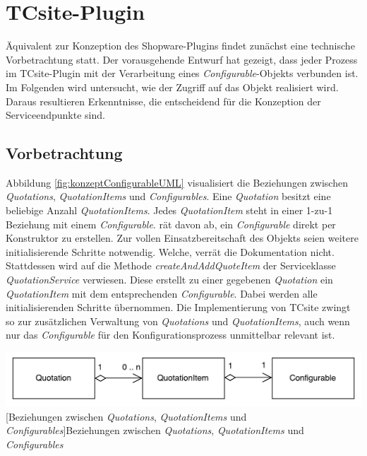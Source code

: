 \documentclass[11pt, a4paper, titlepage, listof=totoc, bibliography=totoc, index=totoc, twoside, openright, headings=normal]{scrreprt}
\begin{document}
\section{TCsite-Plugin}
\label{TCsite-Plugin}
Äquivalent zur Konzeption des Shopware-Plugins findet zunächst eine technische Vorbetrachtung statt. Der vorausgehende Entwurf hat gezeigt, dass jeder Prozess im TCsite-Plugin mit der Verarbeitung eines \emph{Configurable}-Objekts verbunden ist. Im Folgenden wird untersucht, wie der Zugriff auf das Objekt realisiert wird. Daraus resultieren Erkenntnisse, die entscheidend für die Konzeption der Serviceendpunkte sind.

\subsection{Vorbetrachtung}
Abbildung \ref{fig:konzeptConfigurableUML} visualisiert die Beziehungen zwischen \emph{Quotations}, \emph{QuotationItems} und \emph{Configurables}. Eine \emph{Quotation} besitzt eine beliebige Anzahl \emph{QuotationItems}. Jedes \emph{QuotationItem} steht in einer 1-zu-1 Beziehung mit einem \emph{Configurable}. \citet{tactonTCsiteDevelopmentManual} rät davon ab, ein \emph{Configurable} direkt per Konstruktor zu erstellen. Zur vollen Einsatzbereitschaft des Objekts seien weitere initialisierende Schritte notwendig. Welche, verrät die Dokumentation nicht. Stattdessen wird auf die Methode \emph{createAndAddQuoteItem} der Serviceklasse \emph{QuotationService} verwiesen.  Diese erstellt zu einer gegebenen \emph{Quotation} ein \emph{QuotationItem} mit dem entsprechenden \emph{Configurable}. Dabei werden alle initialisierenden Schritte übernommen. Die Implementierung von TCsite zwingt so zur zusätzlichen Verwaltung von \emph{Quotations} und \emph{QuotationItems}, auch wenn nur das \emph{Configurable} für den Konfigurationsprozess unmittelbar relevant ist.

\vspace{1em}
\begin{minipage}{\linewidth}
	\centering
	\includegraphics[width=1\linewidth]{Abbildungen/konzeptConfigurableUML.pdf}
	[Beziehungen zwischen \emph{Quotations}, \emph{QuotationItems} und \emph{Configurables}]{Beziehungen zwischen \emph{Quotations}, \emph{QuotationItems} und \emph{Configurables}}
	\label{fig:konzeptConfigurableUML}
\end{minipage}
\vspace{1em}
\end{document}

